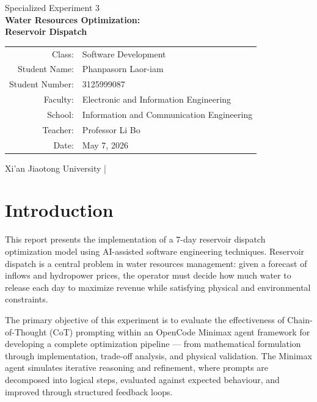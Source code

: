 \documentclass[12pt, a4paper]{article}
\begin{document}
\thispagestyle{empty}

\begin{center}
  \vspace*{1cm}
  {\large Specialized Experiment 3}\\[0.5cm]
  {\LARGE\bfseries Water Resources Optimization:\\[0.3cm]
  Reservoir Dispatch}\\[1.5cm]

  \begin{tabular}{rl}
    Class:          & Software Development \\[2pt]
    Student Name:   & Phanpasorn Laor-iam \\[2pt]
    Student Number: & 3125999087 \\[2pt]
    Faculty:        & Electronic and Information Engineering \\[2pt]
    School:         & Information and Communication Engineering \\[2pt]
    Teacher:        & Professor Li Bo \\[2pt]
    Date:           & May 7, 2026 \\
  \end{tabular}

  \vfill
  Xi'an Jiaotong University \quad|
\end{center}

\newpage
\pagestyle{fancy}

\tableofcontents
\newpage

\section{Introduction}

This report presents the implementation of a 7-day reservoir dispatch optimization model using AI-assisted software engineering techniques. Reservoir dispatch is a central problem in water resources management: given a forecast of inflows and hydropower prices, the operator must decide how much water to release each day to maximize revenue while satisfying physical and environmental constraints.

The primary objective of this experiment is to evaluate the effectiveness of Chain-of-Thought (CoT) prompting within an OpenCode Minimax agent framework for developing a complete optimization pipeline — from mathematical formulation through implementation, trade-off analysis, and physical validation. The Minimax agent simulates iterative reasoning and refinement, where prompts are decomposed into logical steps, evaluated against expected behaviour, and improved through structured feedback loops.
\end{document}
